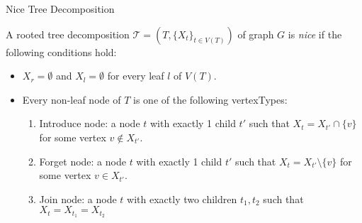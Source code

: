 \documentclass[11pt,t, usenames, dvipsnames]{beamer}
\newcommand{\T}{\mathcal{T}}
\begin{document}
\begin{frame}{Nice Tree Decomposition} 
    \begin{definition}
        A rooted tree decomposition $\T=(T, \{X_t\}_{t \in V(T)})$ of graph $G$ is \textit{nice} if the following conditions hold:
        \begin{itemize}
            \item $X_r = \emptyset$ and $X_l = \emptyset$ for every leaf $l$ of $V(T)$.
            \item Every non-leaf node of $T$ is one of the following vertexTypes:
            \begin{enumerate}
                \item Introduce node: a node $t$ with exactly 1 child $t'$ such that $X_t = X_{t'} \cap \{v\}$ for some vertex $v \not\in X_{t'}$.
                \item Forget node: a node $t$ with exactly 1 child $t'$ such that $X_t = X_{t'} \setminus \{v\}$ for some vertex $v \in X_{t'}$.
                \item Join node: a node $t$ with exactly two children $t_1, t_2$ such that $X_t = X_{t_1} = X_{t_2}$
            \end{enumerate}
        \end{itemize}
    \end{definition}
\end{frame}
\end{document}

